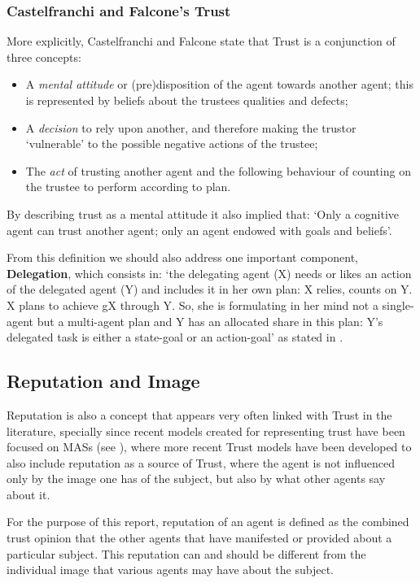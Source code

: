 \subsubsection{Castelfranchi and Falcone's Trust}
\label{subsubsec:CastelfranchiTrust}
More explicitly, Castelfranchi and Falcone\cite{Castelfranchi1998} state that Trust is a conjunction of three concepts:
\begin{itemize}
	\item A \textit{mental attitude} or (pre)disposition of the agent towards another agent; this is represented by beliefs about the trustees qualities and defects;
	\item A \textit{decision} to rely upon another, and therefore making the trustor `vulnerable' to the possible negative actions of the trustee;
	\item The \textit{act} of trusting another agent and the following behaviour of counting on the trustee to perform according to plan. 
\end{itemize}
By describing trust as a mental attitude it also implied that: `Only a cognitive agent can trust another agent; only an agent endowed with goals and beliefs'\cite{Castelfranchi2010}.

From this definition we should also address one important component, \textbf{Delegation}, which consists in: `the delegating agent (X) needs or likes an action of the delegated agent (Y) and includes it in her own plan: X relies, counts on Y. X plans to achieve gX through Y. So, she is formulating in her mind not a single-agent but a multi-agent plan and Y has an allocated share in this plan: Y’s delegated task is either a state-goal or an action-goal' as stated in \cite{Castelfranchi1998}.



\subsection{Reputation and Image}
\label{subsec:Reputation}
Reputation is also a concept that appears very often linked with Trust in the literature, specially since recent models created for representing trust have been focused on \acp{MAS} (see \cite{Abdul-rahman2000, Sabater2002, Sabater2006, Huynh2006, Pinyol2009}), where more recent Trust models have been developed to also include reputation as a source of Trust, where the agent is not influenced only by the image one has of the subject, but also by what other agents say about it.

For the purpose of this report, reputation of an agent is defined as the combined trust opinion that the other agents that have manifested or provided about a particular subject. This reputation can and should be different from the individual image that various agents may have about the subject.


